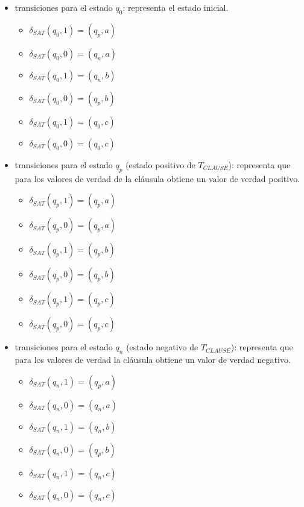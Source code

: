 \begin{itemize}
    \item  transiciones para el estado $q_0$: representa el estado inicial.
          \begin{multicols}{2}
              \begin{itemize}
                  \item $\delta_{SAT}(q_0,1)=(q_p,a)$
                  \item $\delta_{SAT}(q_0,0)=(q_n,a)$
                  \item $\delta_{SAT}(q_0,1)=(q_n,b)$
                  \item $\delta_{SAT}(q_0,0)=(q_p,b)$
                  \item $\delta_{SAT}(q_0,1)=(q_0,c)$
                  \item $\delta_{SAT}(q_0,0)=(q_0,c)$
              \end{itemize}
          \end{multicols}
          
    \item  transiciones para el estado $q_p$ (estado positivo de $T_{CLAUSE}$): representa que para los valores de verdad de la cláusula obtiene un valor de verdad positivo.
          \begin{multicols}{2}
              \begin{itemize}
                  \item $\delta_{SAT}(q_{p},1)=(q_{p},a)$
                  \item $\delta_{SAT}(q_{p},0)=(q_{p},a)$
                  \item $\delta_{SAT}(q_{p},1)=(q_{p},b)$
                  \item $\delta_{SAT}(q_{p},0)=(q_{p},b)$
                  \item $\delta_{SAT}(q_{p},1)=(q_{p},c)$
                  \item $\delta_{SAT}(q_{p},0)=(q_{p},c)$
              \end{itemize}
          \end{multicols}
          
    \item  transiciones para el estado $q_n$ (estado negativo de $T_{CLAUSE}$): representa que para los valores de verdad la cláusula obtiene un valor de verdad negativo.
          \begin{multicols}{2}
              \begin{itemize}
                  \item $\delta_{SAT}(q_{n},1)=(q_{p},a)$
                  \item $\delta_{SAT}(q_{n},0)=(q_{n},a)$
                  \item $\delta_{SAT}(q_{n},1)=(q_{n},b)$
                  \item $\delta_{SAT}(q_{n},0)=(q_{p},b)$
                  \item $\delta_{SAT}(q_{n},1)=(q_{n},c)$
                  \item $\delta_{SAT}(q_{n},0)=(q_{n},c)$
              \end{itemize}
          \end{multicols}
\end{itemize}

